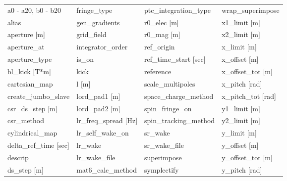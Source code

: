  \begin{tabular}{llll} \toprule
a0 - a20, b0 - b20               & fringe_type                      & ptc_integration_type             & wrap_superimpose                 \\
alias                            & gen_gradients                    & r0_elec [m]                      & x1_limit [m]                     \\
aperture [m]                     & grid_field                       & r0_mag [m]                       & x2_limit [m]                     \\
aperture_at                      & integrator_order                 & ref_origin                       & x_limit [m]                      \\
aperture_type                    & is_on                            & ref_time_start [sec]             & x_offset [m]                     \\
bl_kick [T*m]                    & kick                             & reference                        & x_offset_tot [m]                 \\
cartesian_map                    & l [m]                            & scale_multipoles                 & x_pitch [rad]                    \\
create_jumbo_slave               & lord_pad1 [m]                    & space_charge_method              & x_pitch_tot [rad]                \\
csr_ds_step [m]                  & lord_pad2 [m]                    & spin_fringe_on                   & y1_limit [m]                     \\
csr_method                       & lr_freq_spread [Hz]              & spin_tracking_method             & y2_limit [m]                     \\
cylindrical_map                  & lr_self_wake_on                  & sr_wake                          & y_limit [m]                      \\
delta_ref_time [sec]             & lr_wake                          & sr_wake_file                     & y_offset [m]                     \\
descrip                          & lr_wake_file                     & superimpose                      & y_offset_tot [m]                 \\
ds_step [m]                      & mat6_calc_method                 & symplectify                      & y_pitch [rad]                    \\

\end{tabular}
